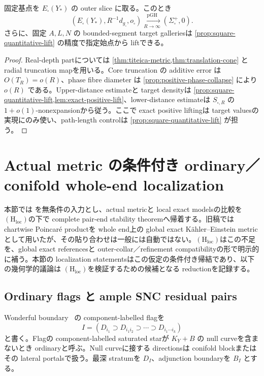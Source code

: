 \documentclass[11pt,a4paper]{ltjsarticle}
\newcommand{\Sigplus}{\Sigma_{\square}^{+}}
\newcommand{\gsq}{g_{\square}}\newcommand{\omsq}{\omega_{\square}}
\newcommand{\Hloc}{\ensuremath{(\mathrm H_{\mathrm{loc}})}}
\theoremstyle{plain}
\theoremstyle{definition}
\theoremstyle{remark}
\begin{document}
\begin{proposition}\label{prop:square-model-pgh}
固定基点を $E_{\square}(Y_*)$ の outer slice に取る。このとき
\[
 (E_{\square}(Y_*),R^{-1}d_{\gsq},o_{\square})
 \xrightarrow[R\to\infty]{\mathrm{pGH}}
 (\Sigplus,0).
\]
さらに、固定 $A,L,N$ の bounded-segment target galleriesは \cref{prop:square-quantitative-lift} の精度で指定始点から liftできる。
\end{proposition}

\begin{proof}
Real-depth partについては \cref{thm:titeica-metric,thm:translation-cone} と radial truncation mapを用いる。Core truncation の additive error は $O(T_R)=o(R)$、phase fibre diameter は \cref{prop:positive-phase-collapse} により $o(R)$ である。Upper-distance estimateと target densityは \cref{prop:square-quantitative-lift,lem:exact-positive-lift}、lower-distance estimateは $S_{\square,R}$ の $1+o(1)$-nonexpansionから従う。ここで exact positive liftingは target valuesの実現にのみ使い、path-length controlは \cref{prop:square-quantitative-lift} が担う。
\end{proof}

\section{Actual metric の条件付き ordinary／conifold whole-end localization}\label{sec:actual-localization}

本節では  を無条件の入力とし、actual metricと local exact modelsの比較を \Hloc の下で complete pair-end stability theoremへ帰着する。旧稿では chartwise Poincar\'e productを whole end上の global exact K\"ahler--Einstein metricとして用いたが、その貼り合わせは一般には自動ではない。\Hloc はこの不足を、global exact referencesと outer-collar／refinement compatibilityの形で明示的に補う。本節の localization statementsはこの仮定の条件付き帰結であり、以下の幾何学的議論は \Hloc を検証するための候補となる reductionを記録する。

\subsection{Ordinary flags と ample SNC residual pairs}
Wonderful boundary~\cite{DCP} の component-labelled flagを
\[
 I=(D_{i_1}\supset D_{i_1i_2}\supset\cdots\supset D_{i_1\cdots i_k})
\]
と書く。Flagの component-labelled saturated starが $K_Y+B$ の null curveを含まないとき ordinaryと呼ぶ。Null curveに接する directionsは conifold blockまたはその lateral portalsで扱う。最深 stratumを $D_I$、adjunction boundaryを $B_I$ とする。
\end{document}
